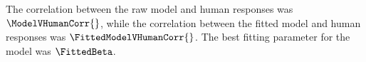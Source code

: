 \documentclass[12pt]{article}
\begin{document}
The correlation between the raw model and human responses was $\ModelVHumanCorr{}$, while the correlation between the fitted model and human responses was $\FittedModelVHumanCorr{}$. The best fitting parameter for the model was $\FittedBeta$.
\end{document}
